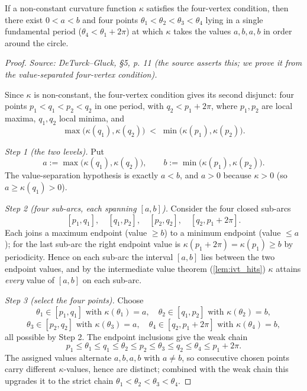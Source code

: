 \begin{lemma}
  \label{lem:abab_values}
  If a non-constant curvature function $\kappa$ satisfies the four-vertex
  condition, then there exist $0 < a < b$ and four points $\theta_1 < \theta_2 <
  \theta_3 < \theta_4$ lying in a single fundamental period
  ($\theta_4 < \theta_1 + 2\pi$) at which $\kappa$ takes the values
  $a, b, a, b$ in order around the circle.
\end{lemma}
\begin{proof}
  \leanok
  \textit{Source: DeTurck--Gluck, §5, p. 11 (the source asserts this; we prove it
  from the value-separated four-vertex condition).}

  Since $\kappa$ is non-constant, the four-vertex condition gives its second
  disjunct: four points $p_1 < q_1 < p_2 < q_2$ in one period, with $q_2 < p_1 +
  2\pi$, where $p_1, p_2$ are local maxima, $q_1, q_2$ local minima, and
  \[
    \max\bigl(\kappa(q_1), \kappa(q_2)\bigr) \;<\; \min\bigl(\kappa(p_1), \kappa(p_2)\bigr).
  \]

  \emph{Step 1 (the two levels).} Put
  \[
    a := \max\bigl(\kappa(q_1), \kappa(q_2)\bigr), \qquad
    b := \min\bigl(\kappa(p_1), \kappa(p_2)\bigr).
  \]
  The value-separation hypothesis is exactly $a < b$, and $a > 0$ because
  $\kappa > 0$ (so $a \ge \kappa(q_1) > 0$).

  \emph{Step 2 (four sub-arcs, each spanning $[a,b]$).} Consider the four closed
  sub-arcs
  \[
    [p_1, q_1],\quad [q_1, p_2],\quad [p_2, q_2],\quad [q_2, p_1 + 2\pi].
  \]
  Each joins a maximum endpoint (value $\ge b$) to a minimum endpoint (value
  $\le a$); for the last sub-arc the right endpoint value is
  $\kappa(p_1 + 2\pi) = \kappa(p_1) \ge b$ by periodicity. Hence on each sub-arc
  the interval $[a,b]$ lies between the two endpoint values, and by the
  intermediate value theorem (\cref{lem:ivt_hits}) $\kappa$ attains \emph{every}
  value of $[a,b]$ on each sub-arc.

  \emph{Step 3 (select the four points).} Choose
  \[
    \theta_1 \in [p_1, q_1] \text{ with } \kappa(\theta_1) = a, \quad
    \theta_2 \in [q_1, p_2] \text{ with } \kappa(\theta_2) = b,
  \]
  \[
    \theta_3 \in [p_2, q_2] \text{ with } \kappa(\theta_3) = a, \quad
    \theta_4 \in [q_2, p_1 + 2\pi] \text{ with } \kappa(\theta_4) = b,
  \]
  all possible by Step 2. The endpoint inclusions give the weak chain
  \[
    p_1 \le \theta_1 \le q_1 \le \theta_2 \le p_2 \le \theta_3 \le q_2 \le \theta_4 \le p_1 + 2\pi.
  \]
  The assigned values alternate $a, b, a, b$ with $a \ne b$, so consecutive
  chosen points carry different $\kappa$-values, hence are distinct; combined
  with the weak chain this upgrades it to the strict chain $\theta_1 < \theta_2 <
  \theta_3 < \theta_4$.


\end{proof}
